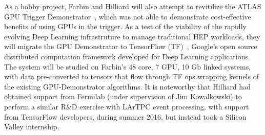 
As a hobby project, Farbin and Hilliard will also attempt to
revitilize the ATLAS GPU Trigger
Demonstrator~\cite{TavaresDelgado:2104313}, which was not able to
demonstrate cost-effective benefits of using GPUs in the trigger. As a
test of the viability of the rapidly evolving Deep Learning
infrastruture to manage traditional HEP workloads, they will migrate
the GPU Demonstrator to TensorFlow
(TF)~\cite{tensorflow2015-whitepaper}, Google's open source
distributed computation framework developed for Deep Learning
applications. The system will be studied on Farbin's 48 core, 7 GPU,
10 Gb linked systems, with data pre-converted to tensors that flow
through TF ops wrapping kernels of the existing GPU-Demonstrator
algorithms. It is noteworthy that Hilliard had obtained support from
Fermilab (under supervision of Jim Kowalkowski) to perform a similar
R\&D exercise with LArTPC event processing, with support from
TensorFlow developers, during summer 2016, but instead took a Silicon
Valley internship.




